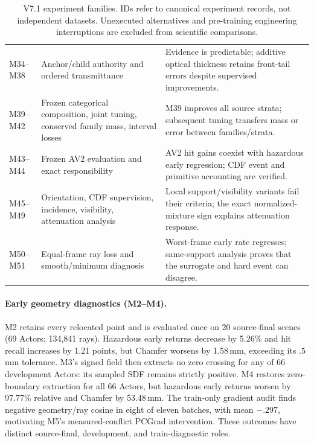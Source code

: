 \begin{table}[t]
\begin{tabular}{p{}p{}p{}}
M34--M38 & Anchor/child authority and ordered transmittance &
Evidence is predictable; additive optical thickness retains front-tail errors despite supervised improvements.\\
M39--M42 & Frozen categorical composition, joint tuning, conserved family mass, interval losses &
M39 improves all source strata; subsequent tuning transfers mass or error between families/strata.\\
M43--M44 & Frozen AV2 evaluation and exact responsibility &
AV2 hit gains coexist with hazardous early regression; CDF event and primitive accounting are verified.\\
M45--M49 & Orientation, CDF supervision, incidence, visibility, attenuation analysis &
Local support/visibility variants fail their criteria; the exact normalized-mixture sign explains attenuation response.\\
M50--M51 & Equal-frame ray loss and smooth/minimum diagnosis &
Worst-frame early rate regresses; same-support analysis proves that the surrogate and hard event can disagree.\\
\bottomrule
\end{tabular}
\caption{V7.1 experiment families. IDs refer to canonical experiment records, not independent datasets.
Unexecuted alternatives and pre-training engineering interruptions are excluded from scientific comparisons.}
\end{table}

\paragraph{Early geometry diagnostics (M2--M4).}
M2 retains every relocated point and is evaluated once on 20 source-final scenes (69 Actors; 134,841 rays).
Hazardous early returns decrease by 5.26\% and hit recall increases by 1.21 points, but Chamfer worsens by
1.58\,mm, exceeding its $.5$\,mm tolerance. M3's signed field then extracts no zero crossing for any of
66 development Actors: its sampled SDF remains strictly positive. M4 restores zero-boundary extraction
for all 66 Actors, but hazardous early returns worsen by 97.77\% relative and Chamfer by 53.48\,mm.
The train-only gradient audit finds negative geometry/ray cosine in eight of eleven batches, with mean
$-.297$, motivating M5's measured-conflict PCGrad intervention. These outcomes have distinct source-final,
development, and train-diagnostic roles.

